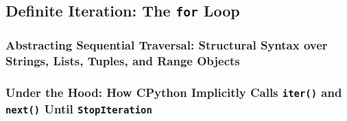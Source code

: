 \subsection{Definite Iteration: The \texttt{for} Loop}
\subsubsection{Abstracting Sequential Traversal: Structural Syntax over Strings, Lists, Tuples, and Range Objects}
\subsubsection{Under the Hood: How CPython Implicitly Calls \texttt{iter()} and \texttt{next()} Until \texttt{StopIteration}}
